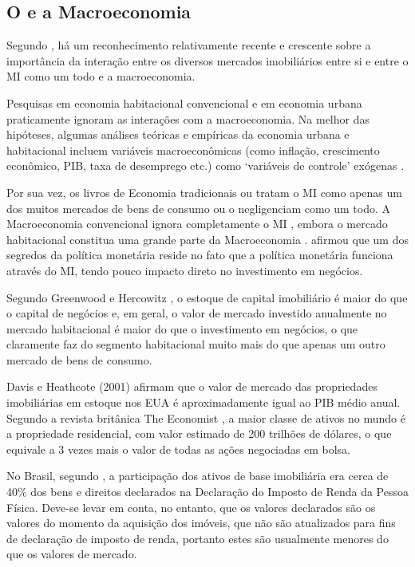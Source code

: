 \documentclass[
	12pt,				%
	oneside,			%
	a4paper,			%
	chapter=TITLE,		%
	section=TITLE,		%
	english,			%
	brazil				%
	]{abntex2}
\begin{document}
\begin{refsection}
\hypertarget{macro}{%
\section{\texorpdfstring{O  e a Macroeconomia}{O  e a Macroeconomia}}\label{macro}}

Segundo \textcite{LEUNG}, há um reconhecimento relativamente recente e crescente
sobre a importância da interação entre os diversos mercados imobiliários entre
si e entre o \gls{MI} como um todo e a macroeconomia.

Pesquisas em economia habitacional convencional e em economia urbana
praticamente ignoram as interações com a macroeconomia. Na melhor das hipóteses,
algumas análises teóricas e empíricas da economia urbana e habitacional incluem
variáveis macroeconômicas (como inflação, crescimento econômico, PIB, taxa de
desemprego etc.) como `variáveis de controle' exógenas \autocite[3]{LEUNG}.

Por sua vez, os livros de Economia tradicionais ou tratam o \gls{MI} como
apenas um dos muitos mercados de bens de consumo ou o negligenciam como um todo.
A Macroeconomia convencional ignora completamente o \gls{MI} \autocite[3]{LEUNG},
embora o mercado habitacional constitua uma grande parte da Macroeconomia
\autocite[5]{LEUNG}. \textcite{krugman} afirmou que um dos segredos da política monetária reside
no fato que a política monetária funciona através do \gls{MI}, tendo
pouco impacto direto no investimento em negócios.

Segundo Greenwood e Hercowitz \autocite[\emph{apud}][5]{LEUNG}, o estoque de capital
imobiliário é maior do que o capital de negócios e, em geral, o valor de mercado
investido anualmente no mercado habitacional é maior do que o investimento em
negócios, o que claramente faz do segmento habitacional muito mais do que apenas
um outro mercado de bens de consumo.

Davis e Heathcote (2001) \autocite[\emph{apud}][6]{LEUNG} afirmam que o valor de mercado das
propriedades imobiliárias em estoque nos \gls{EUA} é aproximadamente igual ao PIB
médio anual. Segundo a revista britânica The Economist \autocite{economist}, a maior
classe de ativos no mundo é a propriedade residencial, com valor estimado de 200
trilhões de dólares, o que equivale a 3 vezes mais o valor de todas as ações
negociadas em bolsa.

No Brasil, segundo \textcites{fnogueira}[155]{fnogueira}, a participação dos ativos de
base imobiliária era cerca de 40\% dos bens e direitos declarados na Declaração
do Imposto de Renda da Pessoa Física. Deve-se levar em conta, no entanto, que
os valores declarados são os valores do momento da aquisição dos imóveis, que
não são atualizados para fins de declaração de imposto de renda, portanto estes
são usualmente menores do que os valores de mercado.


\end{refsection}
\end{document}
